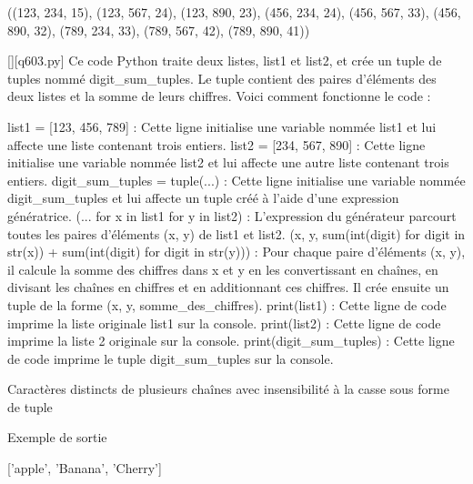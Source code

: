 ((123, 234, 15), (123, 567, 24), (123, 890, 23), (456, 234, 24), (456, 567, 33), (456, 890, 32), (789, 234, 33), (789, 567, 42), (789, 890, 41))
        \par
        \begin{solution}
            \renewcommand{\nomfichier}{q603.py}
            \pythonfile{\chemincode \nomfichier}[][\nomfichier]
            Ce code Python traite deux listes, list1 et list2, et crée un tuple de tuples nommé digit\_sum\_tuples. Le tuple contient des paires d'éléments des deux listes et la somme de leurs chiffres. Voici comment fonctionne le code :

    list1 = [123, 456, 789] : Cette ligne initialise une variable nommée list1 et lui affecte une liste contenant trois entiers.
    list2 = [234, 567, 890] : Cette ligne initialise une variable nommée list2 et lui affecte une autre liste contenant trois entiers.
    digit\_sum\_tuples = tuple(...) : Cette ligne initialise une variable nommée digit\_sum\_tuples et lui affecte un tuple créé à l'aide d'une expression génératrice.
        (... for x in list1 for y in list2) : L'expression du générateur parcourt toutes les paires d'éléments (x, y) de list1 et list2.
        (x, y, sum(int(digit) for digit in str(x)) + sum(int(digit) for digit in str(y))) : Pour chaque paire d'éléments (x, y), il calcule la somme des chiffres dans x et y en les convertissant en chaînes, en divisant les chaînes en chiffres et en additionnant ces chiffres. Il crée ensuite un tuple de la forme (x, y, somme\_des\_chiffres).
    print(list1) : Cette ligne de code imprime la liste originale list1 sur la console.
    print(list2) : Cette ligne de code imprime la liste 2 originale sur la console.
    print(digit\_sum\_tuples) : Cette ligne de code imprime le tuple digit\_sum\_tuples sur la console.
        \end{solution}
        

        \question
        Caractères distincts de plusieurs chaînes avec insensibilité à la casse sous forme de tuple

Exemple de sortie

['apple', 'Banana', 'Cherry']

